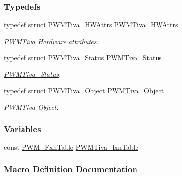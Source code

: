 \subsubsection*{Typedefs}
\begin{DoxyCompactItemize}
\item 
typedef struct \hyperlink{struct_p_w_m_tiva___h_w_attrs}{P\-W\-M\-Tiva\-\_\-\-H\-W\-Attrs} \hyperlink{_p_w_m_tiva_8h_a9dc35e1e545e80c16d6ac60c101e2143}{P\-W\-M\-Tiva\-\_\-\-H\-W\-Attrs}
\begin{DoxyCompactList}\small\item\em P\-W\-M\-Tiva Hardware attributes. \end{DoxyCompactList}\item 
typedef struct \hyperlink{struct_p_w_m_tiva___status}{P\-W\-M\-Tiva\-\_\-\-Status} \hyperlink{_p_w_m_tiva_8h_a76a48f3f7fa2bec8b163b5dc1e5301ee}{P\-W\-M\-Tiva\-\_\-\-Status}
\begin{DoxyCompactList}\small\item\em \hyperlink{struct_p_w_m_tiva___status}{P\-W\-M\-Tiva\-\_\-\-Status}. \end{DoxyCompactList}\item 
typedef struct \hyperlink{struct_p_w_m_tiva___object}{P\-W\-M\-Tiva\-\_\-\-Object} \hyperlink{_p_w_m_tiva_8h_a6a177b361dfd0da20d6fa735b680b5c5}{P\-W\-M\-Tiva\-\_\-\-Object}
\begin{DoxyCompactList}\small\item\em P\-W\-M\-Tiva Object. \end{DoxyCompactList}\end{DoxyCompactItemize}
\subsubsection*{Variables}
\begin{DoxyCompactItemize}
\item 
const \hyperlink{struct_p_w_m___fxn_table}{P\-W\-M\-\_\-\-Fxn\-Table} \hyperlink{_p_w_m_tiva_8h_ae9b8f538f1e9e857629220104addd24a}{P\-W\-M\-Tiva\-\_\-fxn\-Table}
\end{DoxyCompactItemize}


\subsubsection{Macro Definition Documentation}
